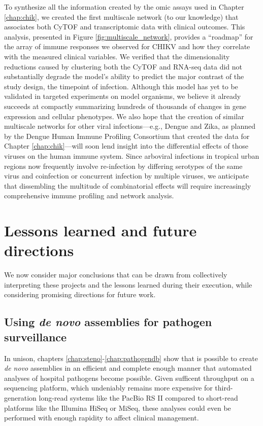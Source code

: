 To synthesize all the information created by the omic assays used in Chapter \ref{chap:chik}, we created the first multiscale network (to our knowledge) that associates both CyTOF and transcriptomic data with clinical outcomes. This analysis, presented in Figure \ref{fig:multiscale_network}, provides a ``roadmap'' for the array of immune responses we observed for CHIKV and how they correlate with the measured clinical variables. We verified that the dimensionality reductions caused by clustering both the CyTOF and RNA-seq data did not substantially degrade the model's ability to predict the major contrast of the study design, the timepoint of infection. Although this model has yet to be validated in targeted experiments on model organisms, we believe it already succeeds at compactly summarizing hundreds of thousands of changes in gene expression and cellular phenotypes. We also hope that the creation of similar multiscale networks for other viral infections—e.g., Dengue and Zika, as planned by the Dengue Human Immune Profiling Consortium that created the data for Chapter \ref{chap:chik}—will soon lend insight into the differential effects of those viruses on the human immune system. Since arboviral infections in tropical urban regions now frequently involve re-infection by differing serotypes of the same virus\autocite{OhAinle2011} and coinfection or concurrent infection by multiple viruses,\autocite{Waggoner2016} we anticipate that dissembling the multitude of combinatorial effects will require increasingly comprehensive immune profiling and network analysis.

\section{Lessons learned and future directions}

We now consider major conclusions that can be drawn from collectively interpreting these projects and the lessons learned during their execution, while considering promising directions for future work.

\subsection{Using \emph{de novo} assemblies for pathogen surveillance}

In unison, chapters \ref{chap:steno}-\ref{chap:pathogendb} show that is possible to create \emph{de novo} assemblies in an efficient and complete enough manner that automated analyses of hospital pathogens become possible. Given sufficent throughput on a sequencing platform, which undeniably remains more expensive for third-generation long-read systems like the PacBio RS II compared to short-read platforms like the Illumina HiSeq or MiSeq, these analyses could even be performed with enough rapidity to affect clinical management.

